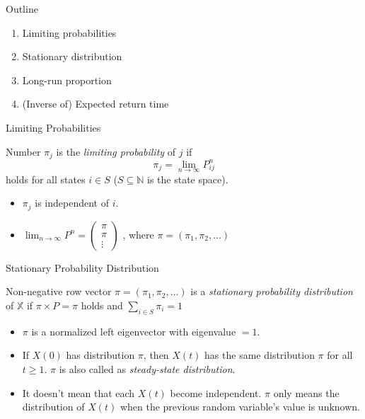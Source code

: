 \documentclass[mathserif]{beamer}
\begin{document}
\begin{frame}{Outline}
	\begin{enumerate}
		\item Limiting probabilities
		\item Stationary distribution
		\item Long-run proportion
		\item (Inverse of) Expected return time
	\end{enumerate}
\end{frame}

\begin{frame}{Limiting Probabilities}
	\begin{definition}
		Number $\pi_j$ is the \textit{limiting probability} of $j$ if
		\[
		\pi_j = \lim_{n \to \infty} P^n_{ij}
		\]
		holds for all states $i \in S$ ($S \subseteq \mathbb{N}$ is the state space).
	\end{definition}
	\begin{itemize}
		\item $\pi_j$ is independent of $i$.
		\item $\lim_{n \to \infty} P^n = 
			\begin{pmatrix}
				\pi \\
				\pi \\
				\vdots
			\end{pmatrix}$
			, where $\pi = (\pi_1, \pi_2, \ldots)$
	\end{itemize}
\end{frame}

\begin{frame}{Stationary Probability Distribution}
	\begin{definition}
		Non-negative row vector $\pi = (\pi_1, \pi_2, \ldots)$
		is a \textit{stationary probability distribution} of $\mathbb{X}$
		if $\pi \times P = \pi$ holds and $\sum_{i \in S} \pi_i = 1$
	\end{definition}
	\begin{itemize}
		\item $\pi$ is a normalized left eigenvector with eigenvalue $=1$.
		\item If $X(0)$ has distribution $\pi$, then $X(t)$ has the same distribution $\pi$
			for all $t \geq 1$.
			$\pi$ is also called as \textit{steady-state distribution}.
		\item It doesn't mean that each $X(t)$ become independent.
			$\pi$ only means the distribution of $X(t)$ when the previous random variable's value is unknown.
	\end{itemize}
\end{frame}
\end{document}
